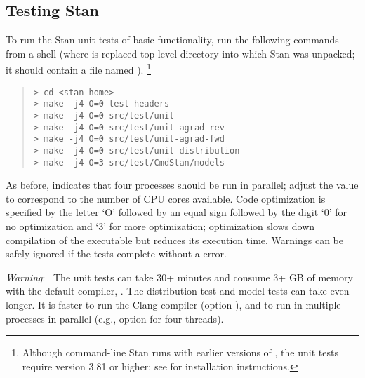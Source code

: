\subsection{Testing Stan}\label{testing-stan.section}

To run the Stan unit tests of basic functionality, run the following
commands from a shell (where  is replaced top-level
directory into which Stan was unpacked; it should contain a file named
).%
%
\footnote{Although command-line Stan runs with earlier versions of
  , the unit tests require version 3.81 or higher; see
   for installation instructions.}
%
\begin{quote}
\begin{Verbatim}[fontshape=sl]
> cd <stan-home>
> make -j4 O=0 test-headers
> make -j4 O=0 src/test/unit
> make -j4 O=0 src/test/unit-agrad-rev
> make -j4 O=0 src/test/unit-agrad-fwd
> make -j4 O=0 src/test/unit-distribution
> make -j4 O=3 src/test/CmdStan/models
\end{Verbatim}
\end{quote}
%
As before,  indicates that four processes should be run in
parallel; adjust the value  to correspond to the number of CPU
cores available. Code optimization is specified by the letter `O'
followed by an equal sign followed by the digit `0' for no
optimization and `3' for more optimization; optimization slows down
compilation of the executable but reduces its execution time.
Warnings can be safely ignored if the tests complete without a
 error.

\emph{Warning}: \ The unit tests can take 30+ minutes and consume 3+
GB of memory with the default compiler, .  The distribution
test and model tests can take even longer.  It is faster to run the
Clang compiler (option ), and to run in multiple
processes in parallel (e.g., option  for four threads).



